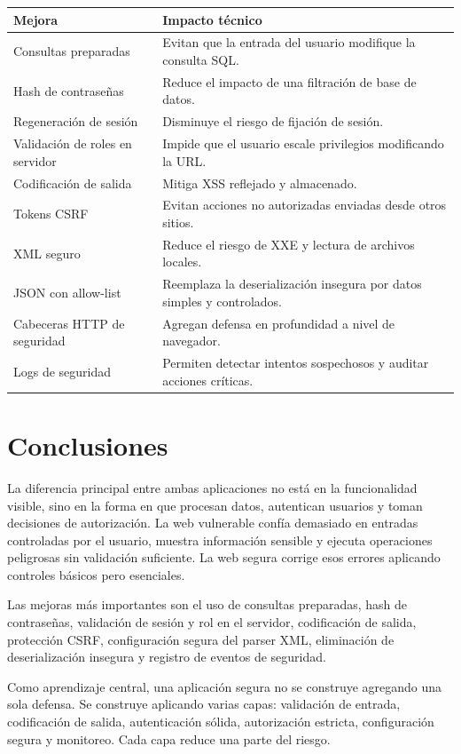 \documentclass[12pt,a4paper]{article}
\begin{document}
\begin{longtable}{|p{4cm}|p{10cm}|}
\hline
\textbf{Mejora} & \textbf{Impacto técnico} \\
\hline
Consultas preparadas & Evitan que la entrada del usuario modifique la consulta SQL. \\
\hline
Hash de contraseñas & Reduce el impacto de una filtración de base de datos. \\
\hline
Regeneración de sesión & Disminuye el riesgo de fijación de sesión. \\
\hline
Validación de roles en servidor & Impide que el usuario escale privilegios modificando la URL. \\
\hline
Codificación de salida & Mitiga XSS reflejado y almacenado. \\
\hline
Tokens CSRF & Evitan acciones no autorizadas enviadas desde otros sitios. \\
\hline
XML seguro & Reduce el riesgo de XXE y lectura de archivos locales. \\
\hline
JSON con allow-list & Reemplaza la deserialización insegura por datos simples y controlados. \\
\hline
Cabeceras HTTP de seguridad & Agregan defensa en profundidad a nivel de navegador. \\
\hline
Logs de seguridad & Permiten detectar intentos sospechosos y auditar acciones críticas. \\
\hline
\end{longtable}

\section{Conclusiones}

La diferencia principal entre ambas aplicaciones no está en la funcionalidad visible, sino en la forma en que procesan datos, autentican usuarios y toman decisiones de autorización. La web vulnerable confía demasiado en entradas controladas por el usuario, muestra información sensible y ejecuta operaciones peligrosas sin validación suficiente. La web segura corrige esos errores aplicando controles básicos pero esenciales.

Las mejoras más importantes son el uso de consultas preparadas, hash de contraseñas, validación de sesión y rol en el servidor, codificación de salida, protección CSRF, configuración segura del parser XML, eliminación de deserialización insegura y registro de eventos de seguridad.

Como aprendizaje central, una aplicación segura no se construye agregando una sola defensa. Se construye aplicando varias capas: validación de entrada, codificación de salida, autenticación sólida, autorización estricta, configuración segura y monitoreo. Cada capa reduce una parte del riesgo.
\end{document}
